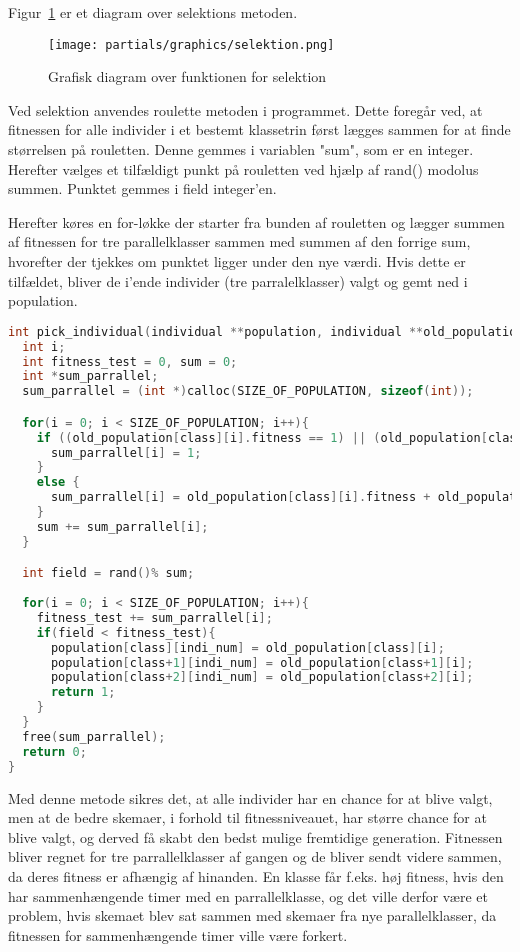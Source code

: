 Figur~\ref{fig:diagramselektion} er et diagram over selektions metoden.
\begin{figure}[!h]
\texttt{[image: partials/graphics/selektion.png]}
\caption{Grafisk diagram over funktionen for selektion}
\label{fig:diagramselektion}
\end{figure}

Ved selektion anvendes roulette metoden i programmet. Dette foregår ved, at fitnessen for alle individer i et bestemt klassetrin først lægges sammen for at finde størrelsen på rouletten. Denne gemmes i variablen "sum", som er en integer. Herefter vælges et tilfældigt punkt på rouletten ved hjælp af rand() modolus summen. Punktet gemmes i field integer'en.

Herefter køres en for-løkke der starter fra bunden af rouletten og lægger summen af fitnessen for tre parallelklasser sammen med summen af den forrige sum, hvorefter der tjekkes om punktet ligger under den nye værdi. Hvis dette er tilfældet, bliver de i'ende individer (tre parralelklasser) valgt og gemt ned i population.  

\begin{lstlisting}[language = c]
int pick_individual(individual **population, individual **old_population, int class, int indi_num){
  int i;
  int fitness_test = 0, sum = 0;
  int *sum_parrallel;
  sum_parrallel = (int *)calloc(SIZE_OF_POPULATION, sizeof(int));

  for(i = 0; i < SIZE_OF_POPULATION; i++){
    if ((old_population[class][i].fitness == 1) || (old_population[class+1][i].fitness == 1) || (old_population[class+2][i].fitness == 1)){
      sum_parrallel[i] = 1;
    }
    else {
      sum_parrallel[i] = old_population[class][i].fitness + old_population[class+1][i].fitness + old_population[class+2][i].fitness;
    }
    sum += sum_parrallel[i];
  }

  int field = rand()% sum;
  
  for(i = 0; i < SIZE_OF_POPULATION; i++){
    fitness_test += sum_parrallel[i];
    if(field < fitness_test){
      population[class][indi_num] = old_population[class][i];
      population[class+1][indi_num] = old_population[class+1][i];
      population[class+2][indi_num] = old_population[class+2][i];
      return 1;
    }
  }
  free(sum_parrallel); 
  return 0;
}
\end{lstlisting}

Med denne metode sikres det, at alle individer har en chance for at blive valgt, men at de bedre skemaer, i forhold til fitnessniveauet, har større chance for at blive valgt, og derved få skabt den bedst mulige fremtidige generation. Fitnessen bliver regnet for tre parrallelklasser af gangen og de bliver sendt videre sammen, da deres fitness er afhængig af hinanden. En klasse får f.eks. høj fitness, hvis den har sammenhængende timer med en parrallelklasse, og det ville derfor være et problem, hvis skemaet blev sat sammen med skemaer fra nye parallelklasser, da fitnessen for sammenhængende timer ville være forkert.